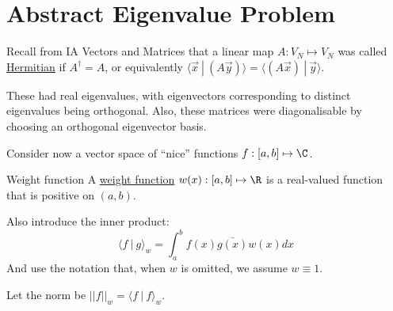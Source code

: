 \documentclass[../Main.tex]{subfiles}
\begin{document}
\section{Abstract Eigenvalue Problem}
Recall from IA Vectors and Matrices that a linear map $A : V_N \mapsto V_N$ was called \underline{Hermitian} if $A^\dagger = A$, or equivalently $\langle\vec{x} ~|~(A\vec{y})\rangle = \langle(A \vec{x}) ~|~ \vec{y}\rangle$.

These had real eigenvalues, with eigenvectors corresponding to distinct eigenvalues being orthogonal. Also, these matrices were diagonalisable by choosing an orthogonal eigenvector basis.

Consider now a vector space of ``nice'' functions $f : [a, b] \mapsto \C$.\begin{definition}{Weight function}
    A \underline{weight function} $w(x) : [a, b] \mapsto \R$ is a real-valued function that is positive on $(a, b)$.
\end{definition}
Also introduce the inner product:
\begin{equation}
    \langle f~|~g\rangle_w = \int_{a}^{b} f(x) \bar{g(x)} w(x) dx 
    \label{eqnInnerFuncProduct}
\end{equation}
And use the notation that, when $w$ is omitted, we assume $w \equiv 1$.

Let the norm be $||f||_w = \langle f~|~f\rangle_w$.
\end{document}
